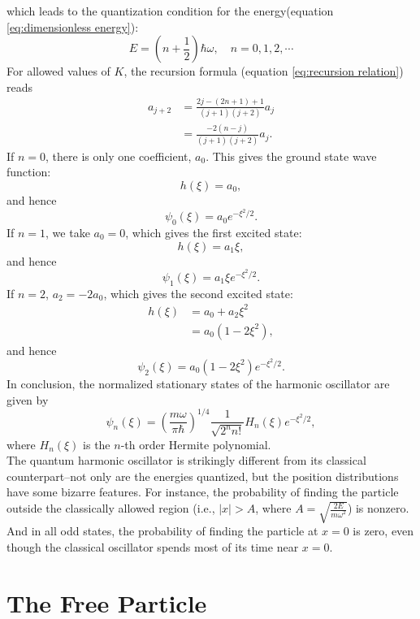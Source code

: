\documentclass[en, oneside]{vivi}
\begin{document}
    which leads to the quantization condition for the energy(equation \eqref{eq:dimensionless energy}):
    \begin{equation}
        E = \left( n + \frac{1}{2} \right) \hbar \omega, \quad n = 0, 1, 2, \cdots
    \end{equation}
    For allowed values of $K$, the recursion formula (equation \eqref{eq:recursion relation}) reads
    \begin{align}
        a_{j+2} &= \frac{2j - (2n + 1) + 1}{(j+1)(j+2)} a_j\\
        &= \frac{-2(n-j)}{(j+1)(j+2)} a_j.
    \end{align}
    If $n = 0$, there is only one coefficient, $a_0$. This gives the ground state wave function:
    \begin{equation*}
        h(\xi) = a_0,
    \end{equation*}
    and hence
    \begin{equation*}
        \psi_0(\xi) = a_0 e^{-\xi^2/2}.
    \end{equation*}
    If $n = 1$, we take $a_0 = 0$, which gives the first excited state:
    \begin{equation*}
        h(\xi) = a_1 \xi,
    \end{equation*}
    and hence
    \begin{equation*}
        \psi_1(\xi) = a_1 \xi e^{-\xi^2/2}.
    \end{equation*}
    If $n = 2$, $a_2 = -2 a_0$, which gives the second excited state:
    \begin{align*}
        h(\xi) &= a_0 + a_2 \xi^2\\
        &= a_0 (1 - 2 \xi^2),
    \end{align*}
    and hence
    \begin{equation*}
        \psi_2(\xi) = a_0 (1 - 2 \xi^2) e^{-\xi^2/2}.
    \end{equation*}
    In conclusion, the normalized stationary states of the harmonic oscillator are given by
    \begin{equation} \label{eq:harmonic oscillator stationary states}
        \psi_n(\xi) = \left( \frac{m \omega}{\pi \hbar} \right)^{1/4} \frac{1}{\sqrt{2^n n!}} H_n(\xi) e^{-\xi^2/2},
    \end{equation}
    where $H_n(\xi)$ is the $n$-th order Hermite polynomial.\\
    The quantum harmonic oscillator is strikingly different from its classical counterpart--not only are the energies quantized, but the position distributions have some bizarre features.
    For instance, the probability of finding the particle outside the  classically allowed region (i.e., $|x| > A$, where $A = \sqrt{\frac{2E}{m\omega^2}}$) is nonzero. 
    And in all odd states, the probability of finding the particle at $x = 0$ is zero, even though the classical oscillator spends most of its time near $x = 0$.
    \section{The Free Particle}
\end{document}
